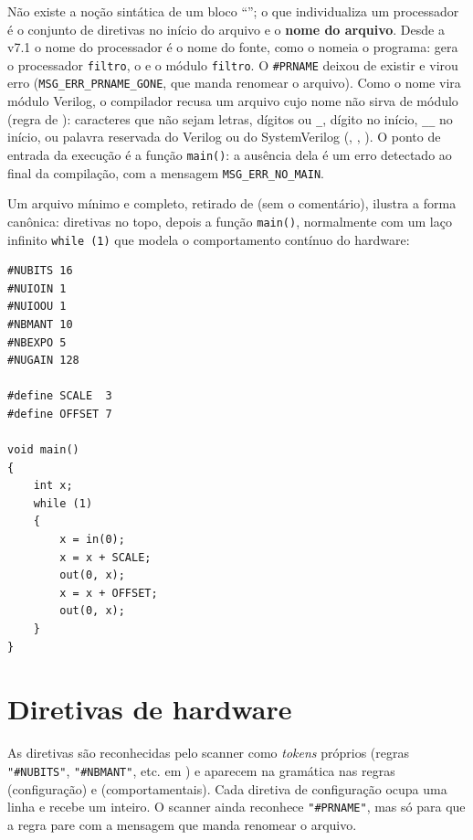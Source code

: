 Não existe a noção sintática de um bloco \enquote{};
o que individualiza um processador é o conjunto de diretivas no início do arquivo
e o \textbf{nome do arquivo}. Desde a v7.1 o nome do processador é o nome do
fonte, como o  nomeia o programa:  gera o processador
\lstinline|filtro|, o  e o módulo \lstinline|filtro|. O
\lstinline|#PRNAME| deixou de existir e virou erro
(\lstinline|MSG_ERR_PRNAME_GONE|, que manda renomear o arquivo). Como o nome vira
módulo Verilog, o compilador recusa um arquivo cujo nome não sirva de módulo
(regra de ): caracteres que não sejam letras,
dígitos ou \lstinline|_|, dígito no início, \lstinline|__| no início, ou palavra
reservada do Verilog ou do SystemVerilog (, ,
). O ponto de entrada da execução é a função \lstinline|main()|:
a ausência dela é um erro detectado ao final da compilação, com a mensagem
\lstinline|MSG_ERR_NO_MAIN|.

Um arquivo \cmm{} mínimo e completo, retirado de
 (sem o comentário), ilustra a forma
canônica: diretivas no topo, depois a função \lstinline|main()|, normalmente com
um laço infinito \lstinline|while (1)| que modela o comportamento contínuo do
hardware:

\begin{lstlisting}[style=cmm]
#NUBITS 16
#NUIOIN 1
#NUIOOU 1
#NBMANT 10
#NBEXPO 5
#NUGAIN 128

#define SCALE  3
#define OFFSET 7

void main()
{
    int x;
    while (1)
    {
        x = in(0);
        x = x + SCALE;
        out(0, x);
        x = x + OFFSET;
        out(0, x);
    }
}
\end{lstlisting}

\section{Diretivas de hardware}
\label{sec:cmm-diretivas}

As diretivas são reconhecidas pelo scanner como \emph{tokens} próprios (regras
\lstinline|"#NUBITS"|, \lstinline|"#NBMANT"|, etc. em ) e
aparecem na gramática nas regras  (configuração) e 
(comportamentais). Cada diretiva de configuração ocupa uma linha e recebe um
inteiro. O scanner ainda reconhece \lstinline|"#PRNAME"|, mas só para que a regra
 pare com a mensagem que manda renomear o arquivo.

